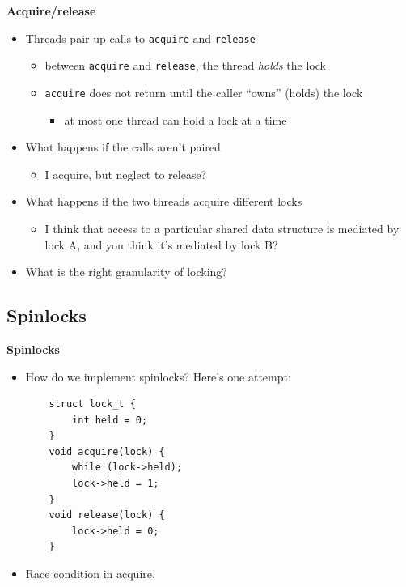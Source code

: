 \documentclass[11pt,a4paper]{article}
\begin{document}
\textbf{Acquire/release}
\begin{itemize}
    \item Threads pair up calls to \texttt{acquire} and \texttt{release}
        \begin{itemize}
            \item between \texttt{acquire} and \texttt{release}, the thread \emph{holds}
                the lock
            \item \texttt{acquire} does not return until the caller ``owns'' (holds) the lock
                \begin{itemize}
                    \item at most one thread can hold a lock at a time
                \end{itemize}
        \end{itemize}
    \item What happens if the calls aren't paired
        \begin{itemize}
            \item I acquire, but neglect to release?
        \end{itemize}
    \item What happens if the two threads acquire different locks
        \begin{itemize}
            \item I think that access to a particular shared data structure is
                mediated by lock A, and you think it's mediated by lock B?\
        \end{itemize}
    \item What is the right granularity of locking?
\end{itemize}

\subsection{Spinlocks}

\textbf{Spinlocks}
\begin{itemize}
    \item How do we implement spinlocks?
        Here's one attempt:
        \begin{verbatim}
    struct lock_t {
        int held = 0;
    }
    void acquire(lock) {
        while (lock->held);
        lock->held = 1;
    }
    void release(lock) {
        lock->held = 0;
    }
        \end{verbatim}
    \item Race condition in acquire.
\end{itemize}
\end{document}
